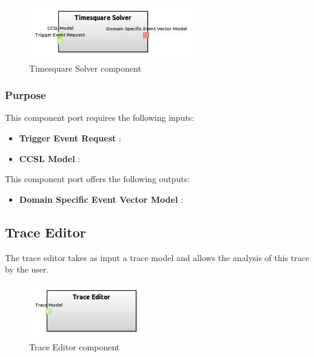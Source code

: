 \documentclass{gemoc} %
\begin{document}
\begin{figure}[htp]
	\begin{center}
	\includegraphics*[trim=0.0cm 0.0cm 0cm 0.0cm, clip=true, scale=1.0]{../images/generated/Generated_Timesquare Solver.jpg}
	\caption{Timesquare Solver component}
	\end{center}
\end{figure}

\subsubsection{Purpose}

This component port requires the following inputs:
\begin{itemize}
  \item \textbf{Trigger Event Request} :
  \item \textbf{CCSL Model} :
\end{itemize}

This component port offers the following outputs:
\begin{itemize}
  \item \textbf{Domain Specific Event Vector Model} :
\end{itemize}

\subsection{Trace Editor}
The trace editor takes as input a trace model and allows the analysis of this trace by the user.
\begin{figure}[htp]
	\begin{center}
	\includegraphics*[trim=0.0cm 0.0cm 0cm 0.0cm, clip=true, scale=1.0]{../images/generated/Generated_Trace Editor.jpg}
	\caption{Trace Editor component}
	\end{center}
\end{figure}
\end{document}
